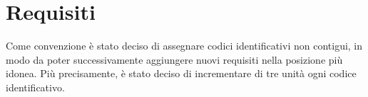 \section{Requisiti}{
	Come convenzione è stato deciso di assegnare codici identificativi non contigui, in modo da poter successivamente aggiungere nuovi requisiti nella posizione più idonea. Più precisamente, è stato deciso di incrementare di tre unità ogni codice identificativo.\\
	
	\newpage
	
	\newpage
	
	\newpage
	
	\newpage
	
}